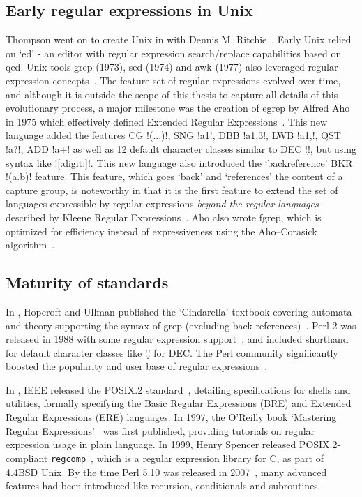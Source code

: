 \subsection{Early regular expressions in Unix}
Thompson went on to create Unix in \citeyear{Ritchie:1974:UTS:361011.361061} with Dennis M. Ritchie~.  Early Unix relied on `ed' - an editor with regular expression search/replace capabilities based on qed.  Unix tools grep (1973), sed (1974) and awk (1977) also leveraged regular expression concepts~.  The feature set of regular expressions evolved over time, and although it is outside the scope of this thesis to capture all details of this evolutionary process, a major milestone was the creation of egrep by Alfred Aho in 1975 which effectively defined Extended Regular Expressions~.  This new language added the features CG \bverb!(...)!, SNG \bverb!a{1}!, DBB \bverb!a{1,3}!, LWB \bverb!a{1,}!, QST \bverb!a?!, ADD \bverb!a+! as well as 12 default character classes similar to DEC \bverb!\d!, but using syntax like \bverb![:digit:]!. This new language also introduced the `backreference' BKR \bverb!(a.b)\1! feature.  This feature, which goes `back' and  `references' the content of a capture group, is noteworthy in that it is the first feature to extend the set of languages expressible by regular expressions \emph{beyond the regular languages} described by Kleene Regular Expressions~. Aho also wrote fgrep, which is optimized for efficiency instead of expressiveness using the Aho–Corasick algorithm~.

\subsection{Maturity of standards}
In \citeyear{HopcroftUllman1979}, Hopcroft and Ullman published the `Cindarella' textbook covering automata and theory supporting the syntax of grep (excluding back-references)~.  Perl 2 was released in 1988 with some regular expression support~, and included shorthand for default character classes like \bverb!\d! for DEC.  The Perl community significantly boosted the popularity and user base of regular expressions~.

In \citeyear{IEEE1994POSIX2}, IEEE released the POSIX.2 standard~, detailing specifications for shells and utilities, formally specifying the Basic Regular Expressions (BRE) and Extended Regular Expressions (ERE) languages.  In 1997, the O'Reilly book `Mastering Regular Expressions'~ was first published, providing tutorials on regular expression usage in plain language.  In 1999, Henry Spencer released POSIX.2-compliant {\tt regcomp}~, which is a regular expression library for C, as part of 4.4BSD Unix.  By the time Perl 5.10 was released in 2007~, many advanced features had been introduced like recursion, conditionals and subroutines.

